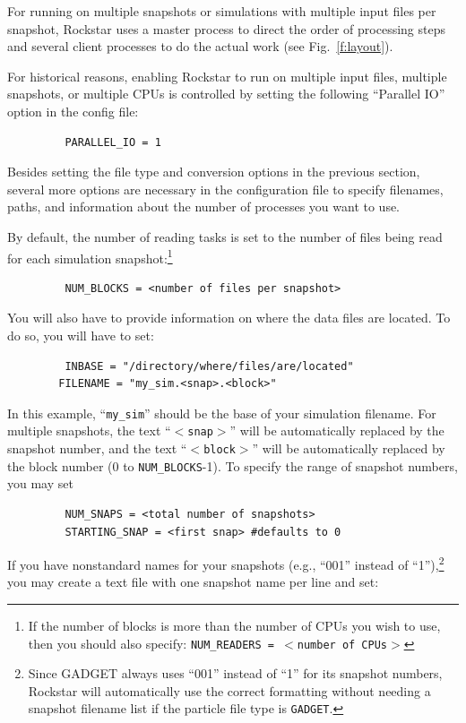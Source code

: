\documentclass[12pt]{article}
\begin{document}
      For running on multiple snapshots or simulations with multiple input
      files per snapshot, Rockstar uses a master process to direct the
      order of processing steps and several client processes to do the
      actual work (see Fig.\ \ref{f:layout}).

      For historical reasons, enabling Rockstar to run on multiple input files,
      multiple snapshots, or multiple CPUs is controlled by setting the following ``Parallel
      IO'' option in the config file:
\begin{verbatim}
      	 PARALLEL_IO = 1
\end{verbatim}
      Besides setting the file type and conversion options in the previous section, 
      several more options are necessary in the configuration file to specify
      filenames, paths, and information about the number of processes you want
      to use.

      By default, the number of reading tasks is set to the number
      of files being read for each simulation snapshot:\footnote{If the number of blocks is more than the number of CPUs you wish to use, then you should also specify: \texttt{NUM\_READERS = $<$number of CPUs$>$}}
\begin{verbatim}
         NUM_BLOCKS = <number of files per snapshot>
\end{verbatim}
      You will also have to provide information on where the data files are
      located.  To do so, you will have to set:
\begin{verbatim}
      	 INBASE = "/directory/where/files/are/located"
        FILENAME = "my_sim.<snap>.<block>"
\end{verbatim}
      In this example, ``\texttt{my\_sim}'' should be the base of your simulation filename.
      For multiple snapshots, the text ``\texttt{$<$snap$>$}'' will be automatically replaced
      by the snapshot number, and the text ``\texttt{$<$block$>$}'' will be automatically
      replaced by the block number (0 to \texttt{NUM\_BLOCKS}-1).  To specify the range
      of snapshot numbers, you may set
\begin{verbatim}
         NUM_SNAPS = <total number of snapshots>
         STARTING_SNAP = <first snap> #defaults to 0
\end{verbatim}  
      If you have nonstandard names for your snapshots (e.g., ``001'' instead of
      ``1''),\footnote{Since GADGET always uses ``001'' instead of ``1'' for its snapshot numbers, Rockstar will automatically use the correct formatting without needing a snapshot filename list if the particle file type is \texttt{GADGET}.} you may create a text file with one snapshot name per line and set:
\end{document}
